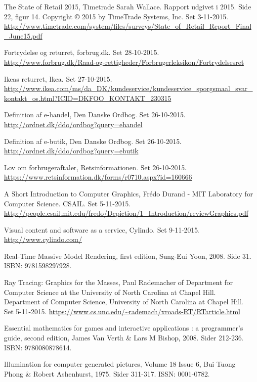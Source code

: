 \begin{thebibliography}{99}
  The State of Retail 2015,
  Timetrade
  Sarah Wallace.
  Rapport udgivet i 2015.
  Side 22, figur 14.
  Copyright © 2015 by TimeTrade Systems, Inc.
  Set 3-11-2015.
  \url{http://www.timetrade.com/system/files/surveys/State_of_Retail_Report_Final_June15.pdf}

  Fortrydelse og returret,
  forbrug.dk.
  Set 28-10-2015.
  \url{http://www.forbrug.dk/Raad-og-rettigheder/Forbrugerleksikon/Fortrydelsesret}

  Ikeas returret,
  Ikea.
  Set 27-10-2015.
  \url{http://www.ikea.com/ms/da_DK/kundeservice/kundeservice_sporgsmaal_svar_kontakt_os.html?ICID=DKFOO_KONTAKT_230315}
  
  Definition af e-handel,
  Den Danske Ordbog.
  Set 26-10-2015.
  \url{http://ordnet.dk/ddo/ordbog?query=ehandel}

  Definition af e-butik,
  Den Danske Ordbog.
  Set 26-10-2015. 
  \url{http://ordnet.dk/ddo/ordbog?query=ebutik}

  Lov om forbrugeraftaler,
  Retsinformationen.
  Set 26-10-2015.
  \url{https://www.retsinformation.dk/forms/r0710.aspx?id=160666}

  A Short Introduction to Computer Graphics,
  Frédo Durand - MIT Laboratory for Computer Science.
  CSAIL.
  Set 5-11-2015.
  \url{http://people.csail.mit.edu/fredo/Depiction/1_Introduction/reviewGraphics.pdf}
  
  Visual content and software as a service,
  Cylindo.
  Set 9-11-2015.
  \url{http://www.cylindo.com/}
  
  Real-Time Massive Model Rendering, first edition, Sung-Eui Yoon, 2008. Side 31. ISBN: 9781598297928.

  Ray Tracing: Graphics for the Masses, 
  Paul Rademacher of Department for Computer Science at the University of North Carolina at Chapel Hill.
  Department of Computer Science, University of North Carolina at Chapel Hill.
  Set 5-11-2015.
  \url{https://www.cs.unc.edu/~rademach/xroads-RT/RTarticle.html}

  Essential mathematics for games and interactive applications : a programmer's guide, second edition, James Van Verth \& Lars M   Bishop, 2008. Sider 212-236. ISBN: 9780080878614.
  
  Illumination for computer generated pictures, Volume 18 Issue 6, Bui Tuong Phong \& Robert Ashenhurst, 1975. Sider 311-317. ISSN: 0001-0782.


\end{thebibliography}
